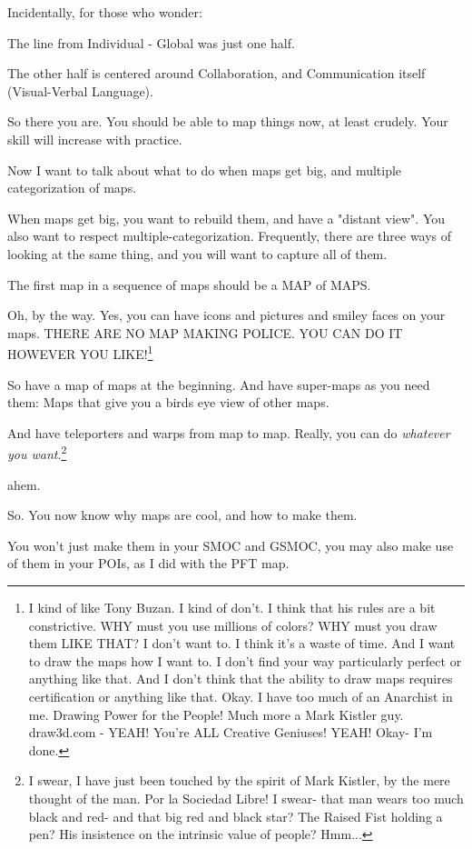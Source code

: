 \documentclass[oneside]{book}
\begin{document}
Incidentally, for those who wonder:

The line from Individual - Global was just one half.

The other half is centered around Collaboration, and Communication
itself (Visual-Verbal Language).

So there you are. You should be able to map things now, at least
crudely. Your skill will increase with practice.

Now I want to talk about what to do when maps get big, and multiple
categorization of maps.

When maps get big, you want to rebuild them, and have a "distant
view". You also want to respect multiple-categorization. Frequently,
there are three ways of looking at the same thing, and you will want
to capture all of them.

The first map in a sequence of maps should be a MAP of MAPS.

Oh, by the way. Yes, you can have icons and pictures and smiley faces
on your maps. THERE ARE NO MAP MAKING POLICE. YOU CAN DO IT HOWEVER
YOU LIKE!\footnote{
I kind of like Tony Buzan. I kind of don't. I think that his
rules are a bit constrictive. WHY must you use millions of colors? WHY
must you draw them LIKE THAT? I don't want to. I think it's a waste of
time. And I want to draw the maps how I want to. I don't find your way
particularly perfect or anything like that. And I don't think that the
ability to draw maps requires certification or anything like
that. Okay. I have too much of an Anarchist in me. Drawing Power for
the People! Much more a Mark Kistler guy. draw3d.com - YEAH! You're
ALL Creative Geniuses! YEAH! Okay- I'm done.}

So have a map of maps at the beginning. And have super-maps as you
need them: Maps that give you a birds eye view of other maps.

And have teleporters and warps from map to map. Really, you can do
\emph{whatever you want}.\footnote{
I swear, I have just been touched by the spirit of Mark Kistler, by
the mere thought of the man. Por la Sociedad Libre! I swear- that man
wears too much black and red- and that big red and black star? The
Raised Fist holding a pen? His insistence on the intrinsic value of
people? Hmm...}

ahem.

So. You now know why maps are cool, and how to make them.

You won't just make them in your SMOC and GSMOC, you may also make use
of them in your POIs, as I did with the PFT map.
\end{document}
